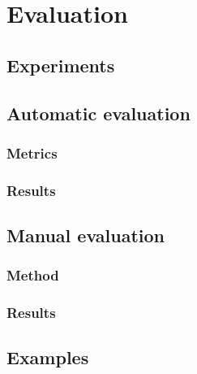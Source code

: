 \chapter{Evaluation}

\section{Experiments}

\section{Automatic evaluation}
\subsection{Metrics}
\subsection{Results}

\section{Manual evaluation}
\subsection{Method}
\subsection{Results}

\section{Examples}